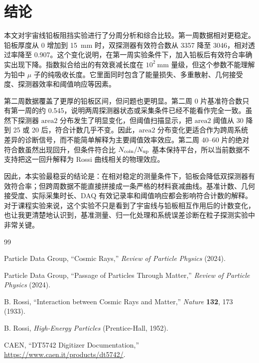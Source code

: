 \documentclass[aps,prl,twocolumn,superscriptaddress,nofootinbib]{revtex4-2}
\begin{document}
\section{结论}

本文对宇宙线铅板阻挡实验进行了分周分析和综合比较。第一周数据相对更稳定。铅板厚度从 0 增加到 \SI{15}{mm} 时，双探测器有效符合数从 3357 降至 3046，相对透过率降至 0.907。这个变化说明，在第一周实验条件下，加入铅板后有效符合率确实出现下降。指数拟合给出的有效衰减长度在 $10^2\ \mathrm{mm}$ 量级，但这个参数不能理解为铅中 $\mu$ 子的纯吸收长度。它里面同时包含了能量损失、多重散射、几何接受度、探测器效率和阈值响应等因素。

第二周数据覆盖了更厚的铅板区间，但问题也更明显。第二周 0 片基准符合数只有第一周的约 0.545，说明两周探测器状态或采集条件已经不能看作完全一致。虽然下探测器 \(\mathrm{area2}\) 分布发生了明显变化，但阈值扫描显示，把 \(\mathrm{area2}\) 阈值从 30 降到 25 或 20 后，符合计数几乎不变。因此，\(\mathrm{area2}\) 分布变化更适合作为跨周系统差异的诊断信号，而不能简单解释为主要阈值效率效应。第二周 40--60 片的绝对符合数虽然出现回升，但条件符合比 \(N_{\rm coin}/N_{\rm up}\) 基本保持平台，所以当前数据不支持把这一回升解释为 Rossi 曲线相关的物理效应。

因此，本实验最稳妥的结论是：在相对稳定的测量条件下，铅板会降低双探测器有效符合率；但跨周数据不能直接拼接成一条严格的材料衰减曲线。基准计数、几何接受度、实际采集时长、DAQ 有效记录率和阈值响应都会影响符合计数的解释。对于课程实验来说，这个实验不只是看到了宇宙线与铅板相互作用后的计数变化，也让我更清楚地认识到，基准测量、归一化处理和系统误差诊断在粒子探测实验中非常关键。

\begin{thebibliography}{99}

Particle Data Group, ``Cosmic Rays,'' \textit{Review of Particle Physics} (2024).

Particle Data Group, ``Passage of Particles Through Matter,'' \textit{Review of Particle Physics} (2024).

B. Rossi, ``Interaction between Cosmic Rays and Matter,'' \textit{Nature} \textbf{132}, 173 (1933).

B. Rossi, \textit{High-Energy Particles} (Prentice-Hall, 1952).

CAEN, ``DT5742 Digitizer Documentation,'' \url{https://www.caen.it/products/dt5742/}.

\end{thebibliography}
\end{document}

